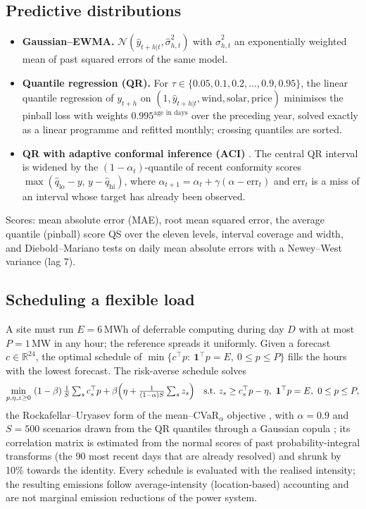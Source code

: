 \documentclass[11pt,a4paper]{article}
\begin{document}
\subsection{Predictive distributions}
\begin{itemize}
\item \textbf{Gaussian--EWMA.} $\mathcal N(\hat y_{t+h|t},\hat\sigma^2_{h,t})$ with $\hat\sigma^2_{h,t}$ an exponentially weighted mean of past squared errors of the same model.
\item \textbf{Quantile regression (QR).} For $\tau\in\{0.05,0.1,0.2,\dots,0.9,0.95\}$, the linear quantile regression of $y_{t+h}$ on $(1,\hat y_{t+h|t},\text{wind},\text{solar},\text{price})$ minimises the pinball loss with weights $0.995^{\text{age in days}}$ over the preceding year, solved exactly as a linear programme and refitted monthly; crossing quantiles are sorted.
\item \textbf{QR with adaptive conformal inference (ACI)} \cite{gibbs2021}. The central QR interval is widened by the $(1-\alpha_t)$-quantile of recent conformity scores $\max(\hat q_{\mathrm{lo}}-y,\,y-\hat q_{\mathrm{hi}})$, where $\alpha_{t+1}=\alpha_t+\gamma(\alpha-\mathrm{err}_t)$ and $\mathrm{err}_t$ is a miss of an interval whose target has already been observed.
\end{itemize}
Scores: mean absolute error (MAE), root mean squared error, the average quantile (pinball) score QS over the eleven levels, interval coverage and width, and Diebold--Mariano tests on daily mean absolute errors with a Newey--West variance (lag 7).

\subsection{Scheduling a flexible load}
\label{sec:sched}
A site must run $E=6$\,MWh of deferrable computing during day $D$ with at most $P=1$\,MW in any hour; the reference spreads it uniformly.
Given a forecast $c\in\mathbb R^{24}$, the optimal schedule of $\min\{c^\top p:\ \mathbf 1^\top p=E,\ 0\le p\le P\}$ fills the hours with the lowest forecast.
The risk-averse schedule solves
\begin{equation}
\min_{p,\eta,z\ge0}\ (1-\beta)\,\tfrac1S\textstyle\sum_s c_s^\top p+\beta\Bigl(\eta+\tfrac{1}{(1-\alpha)S}\sum_s z_s\Bigr)
\quad\text{s.t.}\ z_s\ge c_s^\top p-\eta,\ \mathbf 1^\top p=E,\ 0\le p\le P,
\end{equation}
the Rockafellar--Uryasev form of the mean--CVaR$_\alpha$ objective \cite{rockafellar2000}, with $\alpha=0.9$ and $S=500$ scenarios drawn from the QR quantiles through a Gaussian copula \cite{pinson2009}; its correlation matrix is estimated from the normal scores of past probability-integral transforms (the 90 most recent days that are already resolved) and shrunk by 10\% towards the identity.
Every schedule is evaluated with the realised intensity; the resulting emissions follow average-intensity (location-based) accounting and are not marginal emission reductions of the power system.
\end{document}
